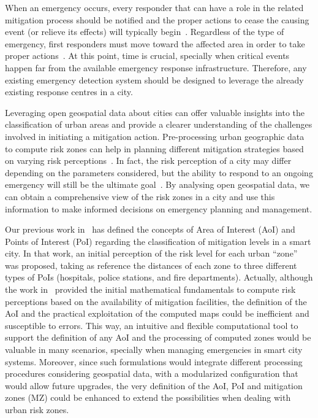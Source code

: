 \begin{refsection}
When an emergency occurs, every responder that can have a role in the related mitigation process should be notified and the proper actions to cease the causing event (or relieve its effects) will typically begin~\cite{Costa_2020,emergencies2}. Regardless of the type of emergency, first responders must move toward the affected area in order to take proper actions~\cite{emergencies3}. At this point, time is crucial, specially when critical events happen far from the available emergency response infrastructure. Therefore, any existing emergency detection system should be designed to leverage the already existing response centres in a city.

Leveraging open geospatial data about cities can offer valuable insights into the classification of urban areas and provide a clearer understanding of the challenges involved in initiating a mitigation action. Pre-processing urban geographic data to compute risk zones can help in planning different mitigation strategies based on varying risk perceptions~\cite{riskcities}. In fact, the risk perception of a city may differ depending on the parameters considered, but the ability to respond to an ongoing emergency will still be the ultimate goal~\cite{emergencies3}. By analysing open geospatial data, we can obtain a comprehensive view of the risk zones in a city and use this information to make informed decisions on emergency planning and management.

Our previous work in~\cite{riskzones} has defined the concepts of Area of Interest (AoI) and Points of Interest (PoI) regarding the classification of mitigation levels in a smart city. In that work, an initial perception of the risk level for each urban ``zone'' was proposed, taking as reference the distances of each zone to three different types of PoIs (hospitals, police stations, and fire departments). Actually, although the work in~\cite{riskzones} provided the initial mathematical fundamentals to compute risk perceptions based on the availability of mitigation facilities, the definition of the AoI and the practical exploitation of the computed maps could be inefficient and susceptible to errors. This way, an intuitive and flexible computational tool to support the definition of any AoI and the processing of computed zones would be valuable in many scenarios, specially when managing emergencies in smart city systems. Moreover, since such formulations would integrate different processing procedures considering geospatial data, with a modularized configuration that would allow future upgrades, the very definition of the AoI, PoI and mitigation zones (MZ) could be enhanced to extend the possibilities when dealing with urban risk zones.


\end{refsection}
